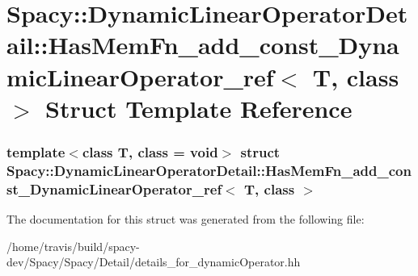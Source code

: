 \hypertarget{structSpacy_1_1DynamicLinearOperatorDetail_1_1HasMemFn__add__const__DynamicLinearOperator__ref}{\section{\-Spacy\-:\-:\-Dynamic\-Linear\-Operator\-Detail\-:\-:\-Has\-Mem\-Fn\-\_\-add\-\_\-const\-\_\-\-Dynamic\-Linear\-Operator\-\_\-ref$<$ \-T, class $>$ \-Struct \-Template \-Reference}
\label{structSpacy_1_1DynamicLinearOperatorDetail_1_1HasMemFn__add__const__DynamicLinearOperator__ref}
}
\subsubsection*{template$<$class T, class = void$>$ struct Spacy\-::\-Dynamic\-Linear\-Operator\-Detail\-::\-Has\-Mem\-Fn\-\_\-add\-\_\-const\-\_\-\-Dynamic\-Linear\-Operator\-\_\-ref$<$ T, class $>$}



\-The documentation for this struct was generated from the following file\-:\begin{DoxyCompactItemize}
\item 
/home/travis/build/spacy-\/dev/\-Spacy/\-Spacy/\-Detail/details\-\_\-for\-\_\-dynamic\-Operator.\-hh\end{DoxyCompactItemize}
